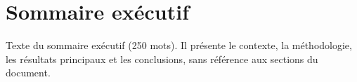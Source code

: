 \documentclass[../main.tex]{subfiles}
\begin{document}

\chapter*{Sommaire exécutif}
Texte du sommaire exécutif (250 mots).
Il présente le contexte, la méthodologie, les résultats principaux et les conclusions,
sans référence aux sections du document.
\end{document}
